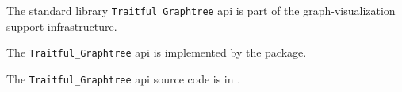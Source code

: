 
The standard library {\tt Traitful\_Graphtree} api is part of the graph-visualization support infrastructure.

The {\tt Traitful\_Graphtree} api is implemented by the  package.

The {\tt Traitful\_Graphtree} api source code is in .






